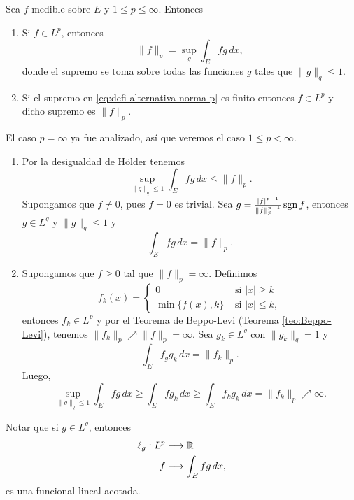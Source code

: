 \begin{teorema}{}
Sea $f$ medible sobre $E$ y $1\leq p\leq \infty$.
Entonces
\begin{enumerate}
    \item Si $f \in L^p$, entonces 
   \begin{equation}\label{eq:defi-alternativa-norma-p}
        \|f \|_p=\sup\limits_{g} \int_E fg\, dx,
   \end{equation}
   donde el supremo se toma sobre todas las funciones $g$ tales que
   $\|g\|_q\leq 1$.
   \item Si el supremo en \eqref{eq:defi-alternativa-norma-p} es finito entonces  $f \in L^p$ y dicho supremo es $\|f \|_p$.
   \end{enumerate}
\end{teorema}

\begin{demo}
El caso $p=\infty$ ya fue analizado, as\'i que veremos el caso $1\leq p<\infty$.
\begin{enumerate}
    \item Por la desigualdad de H\"older tenemos
    \[\sup\limits_{\|g\|_q\leq 1} \int_E fg\,dx \leq \|f\|_p.\]
    Supongamos que $f \neq 0$, pues $f=0$ es trivial.
    Sea $g= \frac{|f|^{p-1}}{\|f\|_p^{p-1}} \operatorname{sgn} f$, entonces
    $g \in L^q$ y $\|g\|_q\leq 1$ y 
    \[ \int_E fg\, dx=\|f\|_p. \]
    \item Supongamos que $f\geq 0$ tal que $\|f\|_p=\infty.$
    Definimos 
    \[
    f_k(x)=\left\{
    \begin{array}{ll}
       0  &    \mbox{ si } |x|\geq k
       \\
    \min\{f(x),k\}     &  \mbox{ si } |x|\leq k,
    \end{array}
    \right.
    \]    
    entonces $f_k \in L^p$ y por el Teorema de Beppo-Levi (Teorema \ref{teo:Beppo-Levi}), tenemos
    $\|f_k\|_p \nearrow \|f\|_p=\infty. $
    Sea  $g_k\in L^q$ con $\|g_k\|_q=1$ y 
    \[
    \int_E f_g g_k\, dx=\|f_k\|_p.
    \] 
    Luego, 
    \[
    \sup\limits_{\|g\|_q\leq 1} \int_E fg\,dx \geq 
    \int_E fg_k\,dx \geq \int_E f_k g_k \,dx=\|f_k\|_p \nearrow\infty.
    \]
        \end{enumerate}
\end{demo}


Notar que si $g \in L^q$, entonces
\[\begin{split}
\ell_g: L^p &\longrightarrow \mathbb{R}
\\
f &\longmapsto \int_E fg\,dx,
\end{split}
\]
es una funcional lineal acotada. 

